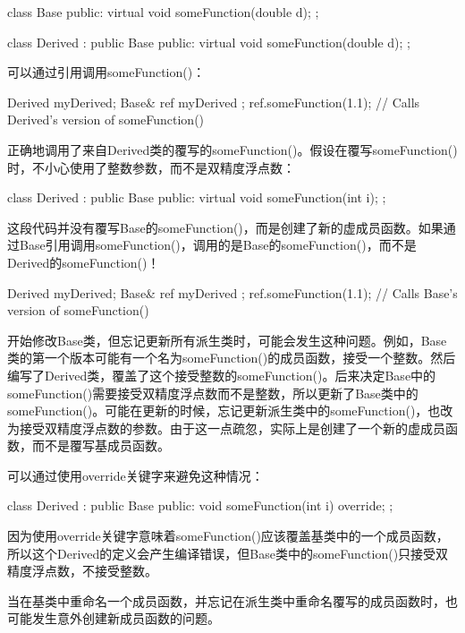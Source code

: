 \begin{cpp}
class Base
{
    public:
    virtual void someFunction(double d);
};

class Derived : public Base
{
    public:
    virtual void someFunction(double d);
};
\end{cpp}

可以通过引用调用someFunction()：

\begin{cpp}
Derived myDerived;
Base& ref { myDerived };
ref.someFunction(1.1); // Calls Derived's version of someFunction()
\end{cpp}

正确地调用了来自Derived类的覆写的someFunction()。假设在覆写someFunction()时，不小心使用了整数参数，而不是双精度浮点数：

\begin{cpp}
class Derived : public Base
{
    public:
        virtual void someFunction(int i);
};
\end{cpp}

这段代码并没有覆写Base的someFunction()，而是创建了新的虚成员函数。如果通过Base引用调用someFunction()，调用的是Base的someFunction()，而不是Derived的someFunction()！

\begin{cpp}
Derived myDerived;
Base& ref { myDerived };
ref.someFunction(1.1); // Calls Base's version of someFunction()
\end{cpp}

开始修改Base类，但忘记更新所有派生类时，可能会发生这种问题。例如，Base类的第一个版本可能有一个名为someFunction()的成员函数，接受一个整数。然后编写了Derived类，覆盖了这个接受整数的someFunction()。后来决定Base中的someFunction()需要接受双精度浮点数而不是整数，所以更新了Base类中的someFunction()。可能在更新的时候，忘记更新派生类中的someFunction()，也改为接受双精度浮点数的参数。由于这一点疏忽，实际上是创建了一个新的虚成员函数，而不是覆写基成员函数。

可以通过使用override关键字来避免这种情况：

\begin{cpp}
class Derived : public Base
{
    public:
        void someFunction(int i) override;
};
\end{cpp}

因为使用override关键字意味着someFunction()应该覆盖基类中的一个成员函数，所以这个Derived的定义会产生编译错误，但Base类中的someFunction()只接受双精度浮点数，不接受整数。

当在基类中重命名一个成员函数，并忘记在派生类中重命名覆写的成员函数时，也可能发生意外创建新成员函数的问题。

